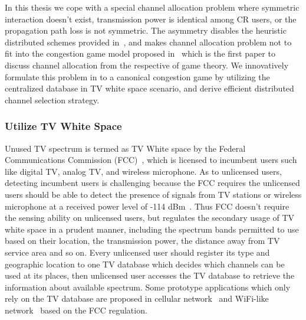In this thesis we cope with a special channel allocation problem where symmetric interaction doesn't exist, \ie transmission power is identical among CR users, or the propagation path loss is not symmetric. 
The asymmetry disables the heuristic distributed schemes provided in~\cite{Babadi08, Ko_DistributedCA}, and makes channel allocation problem not to fit into the congestion game model proposed in~\cite{allerton08_liu} which is the first paper to discuss channel allocation from the respective of game theory.
We innovatively formulate this problem in to a canonical congestion game by utilizing the centralized database in TV white space scenario, and derive efficient distributed channel selection strategy.

\subsubsection*{Utilize TV White Space}
Unused TV spectrum is termed as TV White space by the Federal Communications Commission (FCC)~\cite{FCC_2010_sedond_memorandumm}, which is licensed to incumbent users such like digital TV, analog TV, and wireless microphone.
As to unlicensed users, detecting incumbent users is challenging because the FCC requires the unlicensed users should be able to detect the presence of signals from TV stations or wireless microphone at a received power level of -114 dBm~\cite{Technical_Challenges_TVwhit}. 
Thus FCC doesn't require the sensing ability on unlicensed users, but regulates the secondary usage of TV white space in a prudent manner, including the spectrum bands permitted to use based on their location, the transmission power, the distance away from TV service area and so on.
Every unlicensed user should register its type and geographic location to one TV database which decides which channels can be used at its places, then unlicensed user accesses the TV database to retrieve the information about available spectrum.
Some prototype applications which only rely on the TV database are proposed in cellular network~\cite{tvwhite_lte2011, multicell_geo_dyspan11} and WiFi-like network~\cite{whitefi09} based on the FCC regulation.
  
